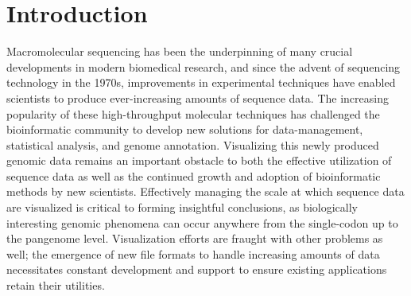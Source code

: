 \documentclass[twocolumn]{article}
\begin{document}
\section*{Introduction}
Macromolecular sequencing has been the underpinning of many crucial developments in modern biomedical research, and since the advent of sequencing technology in the 1970s, improvements in experimental techniques have enabled scientists to produce ever-increasing amounts of sequence data.\cite{Baker2010,Zhang2011}
The increasing popularity of these high-throughput molecular techniques has challenged the bioinformatic community to develop new solutions for data-management, statistical analysis, and genome annotation. Visualizing this newly produced genomic data remains an important obstacle to both the effective utilization of sequence data as well as the continued growth and adoption of bioinformatic methods by new scientists. Effectively managing the scale at which sequence data are visualized is critical to forming insightful conclusions, as biologically interesting genomic phenomena can occur anywhere from the single-codon up to the pangenome level. Visualization efforts are fraught with other problems as well; the emergence of new file formats to handle increasing amounts of data necessitates constant development and support to ensure existing applications retain their utilities.\cite{challenge} %
\end{document}
